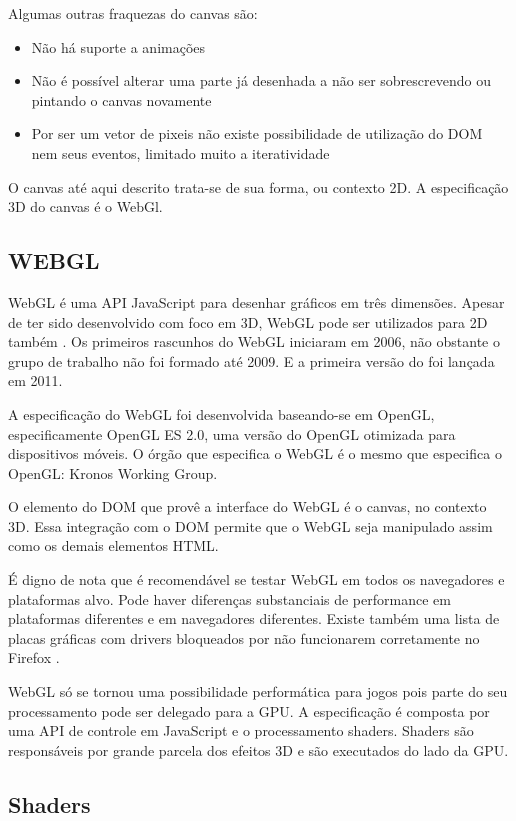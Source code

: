 Algumas outras fraquezas do canvas são:
\begin{itemize}
\item{Não há suporte a animações}
\item{Não é possível alterar uma parte já desenhada a não ser sobrescrevendo ou pintando o canvas novamente}
\item{Por ser um vetor de pixeis não existe possibilidade de utilização do DOM nem seus eventos, limitado muito a iteratividade}
\end{itemize}

O canvas até aqui descrito trata-se de sua forma, ou contexto 2D. A
especificação 3D do canvas é o WebGl.

\subsection{WEBGL}

WebGL é uma API JavaScript para desenhar gráficos em três dimensões.
Apesar de ter sido desenvolvido com foco em 3D, WebGL pode ser
utilizados para 2D também \autocite[pp. 6]{3daps}. Os primeiros
rascunhos do WebGL iniciaram em 2006, não obstante o grupo de trabalho
não foi formado até 2009. E a primeira versão do foi lançada em
2011.

A especificação do WebGL foi desenvolvida baseando-se em OpenGL,
especificamente OpenGL ES 2.0, uma versão do OpenGL otimizada para
dispositivos móveis. O órgão que especifica o WebGL é o mesmo que
especifica o OpenGL: Kronos Working Group.

O elemento do DOM que provê a interface do WebGL é o canvas, no contexto 3D.
Essa integração com o DOM permite que o WebGL seja manipulado assim como os demais elementos HTML.

É digno de nota que é recomendável se testar WebGL em todos os navegadores
e plataformas alvo. Pode haver diferenças substanciais de performance em
plataformas diferentes e em navegadores diferentes. Existe também uma lista
de placas gráficas com drivers bloqueados por não funcionarem corretamente no
Firefox \autocite[pp.42]{3daps}.

WebGL só se tornou uma possibilidade performática para jogos
pois parte do seu processamento pode ser delegado para a GPU. A
especificação é composta por uma API de controle em JavaScript e o
processamento shaders. Shaders são responsáveis por grande parcela dos
efeitos 3D e são executados do lado da GPU.

\subsection{Shaders}

